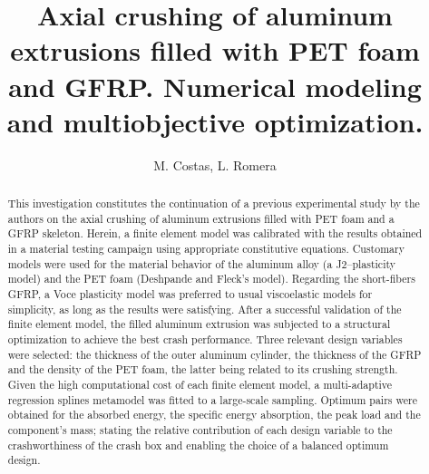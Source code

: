 \documentclass[cmfonts]{witpress}
\begin{document}


\title{Axial crushing of aluminum extrusions filled with PET foam and GFRP. Numerical modeling and multiobjective optimization.}

\author{M. Costas, L. Romera}

\address{Structural Mechanics Group, School of Civil Engineering. Universidade da Coru\~na. Campus de Elvi\~na, 15071, A Coru\~na, Spain}

\maketitle

\begin{abstract}
This investigation constitutes the continuation of a previous experimental study by the authors on the axial crushing of aluminum extrusions filled with PET foam and a GFRP skeleton. Herein, a finite element model was calibrated with the results obtained in a material testing campaign using appropriate constitutive equations. Customary models were used for the material behavior of the aluminum alloy (a J2--plasticity model) and the PET foam (Deshpande and Fleck's model). Regarding the short-fibers GFRP, a Voce plasticity model was preferred to usual viscoelastic models for simplicity, as long as the results were satisfying. After a successful validation of the finite element model, the filled aluminum extrusion was subjected to a structural optimization to achieve the best crash performance. Three relevant design variables were selected: the thickness of the outer aluminum cylinder, the thickness of the GFRP and the density of the PET foam, the latter being related to its crushing strength. Given the high computational cost of each finite element model, a multi-adaptive regression splines metamodel was fitted to a large-scale sampling. Optimum pairs were obtained for the absorbed energy, the specific energy absorption, the peak load and the component's mass; stating the relative contribution of each design variable to the crashworthiness of the crash box and enabling the choice of a balanced optimum design.
\end{abstract}
\end{document}
